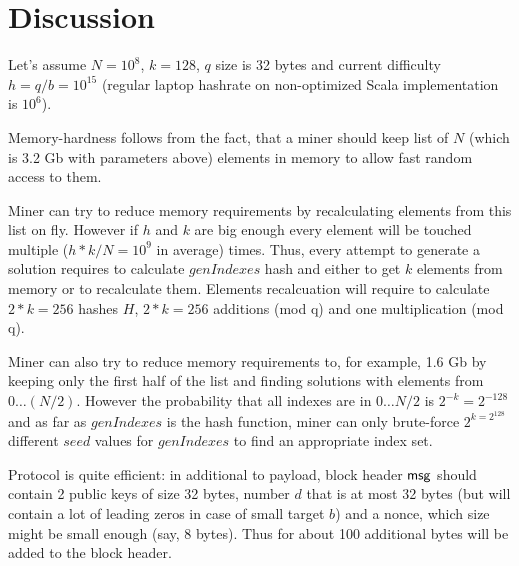 \documentclass[]{llncs}
\begin{document}
    \section{Discussion}

    Let's assume $N=10^8$, $k=128$, $q$ size is 32 bytes and current difficulty
    $h = q / b = 10^{15}$ (regular laptop hashrate on non-optimized Scala implementation is $10^6$).

    Memory-hardness follows from the fact, that a miner should keep list of $N$
    (which is 3.2 Gb with parameters above) elements in memory to allow fast random access to them.

    Miner can try to reduce memory requirements by recalculating elements from this list on fly.
    However if $h$ and $k$ are big enough
    every element will be touched multiple ($h * k / N = 10^9$ in average) times.
    Thus, every attempt to generate a solution requires to calculate $genIndexes$ hash and
    either to get $k$ elements from memory or to recalculate them.
    Elements recalcuation will require to calculate $2 * k = 256$ hashes $H$,
    $2 * k = 256$ additions (mod q) and one multiplication (mod q).

    Miner can also try to reduce memory requirements to, for example, 1.6 Gb
    by keeping only the first half of the list and finding solutions
    with elements from $0 \dots (N/2)$.
    However the probability that all indexes are in $0 \dots N/2$ is
    $2^{-k}=2^{-128}$ and as far as $genIndexes$
    is the hash function, miner can only brute-force $2^{k=2^{128}}$ different $seed$ values for $genIndexes$
    to find an appropriate index set.

    Protocol is quite efficient: in additional to payload, block header $\mathsf{msg}$ should
    contain 2 public keys of size 32 bytes, number $d$ that is at most 32 bytes
    (but will contain a lot of leading zeros in case of small target $b$) and a nonce,
    which size might be small enough (say, 8 bytes). Thus for about 100 additional bytes
    will be added to the block header.

\end{document}
